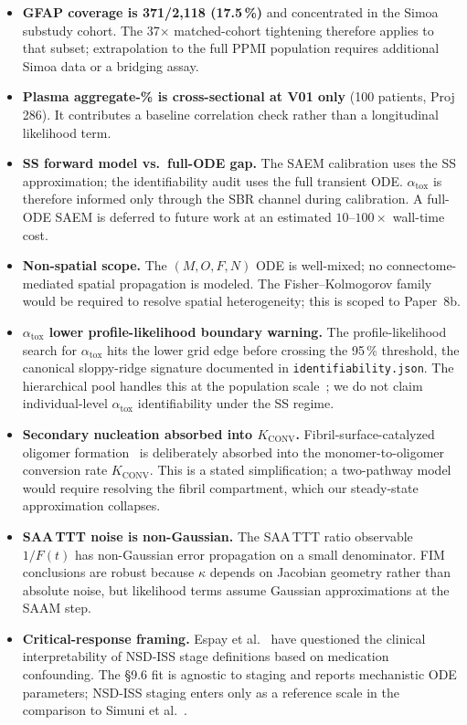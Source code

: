 \begin{itemize}
\item \textbf{GFAP coverage is 371/2,118 (17.5\,\%)} and concentrated in the Simoa substudy cohort. The 37$\times$ matched-cohort tightening therefore applies to that subset; extrapolation to the full PPMI population requires additional Simoa data or a bridging assay.
\item \textbf{Plasma aggregate-\% is cross-sectional at V01 only} (100 patients, Proj 286). It contributes a baseline correlation check rather than a longitudinal likelihood term.
\item \textbf{SS forward model vs.\ full-ODE gap.} The SAEM calibration uses the SS approximation; the identifiability audit uses the full transient ODE. $\alpha_\text{tox}$ is therefore informed only through the SBR channel during calibration. A full-ODE SAEM is deferred to future work at an estimated $10$--$100\times$ wall-time cost.
\item \textbf{Non-spatial scope.} The $(M, O, F, N)$ ODE is well-mixed; no connectome-mediated spatial propagation is modeled. The Fisher--Kolmogorov family~\cite{weickenmeier2019,fornari2019} would be required to resolve spatial heterogeneity; this is scoped to Paper~8b.
\item \textbf{$\alpha_\text{tox}$ lower profile-likelihood boundary warning.} The profile-likelihood search for $\alpha_\text{tox}$ hits the lower grid edge before crossing the 95\,\% threshold, the canonical sloppy-ridge signature documented in \texttt{identifiability.json}. The hierarchical pool handles this at the population scale~\cite{veronneau2020}; we do not claim individual-level $\alpha_\text{tox}$ identifiability under the SS regime.
\item \textbf{Secondary nucleation absorbed into $K_\text{CONV}$.} Fibril-surface-catalyzed oligomer formation~\cite{xu2024} is deliberately absorbed into the monomer-to-oligomer conversion rate $K_\text{CONV}$. This is a stated simplification; a two-pathway model would require resolving the fibril compartment, which our steady-state approximation collapses.
\item \textbf{SAA\,TTT noise is non-Gaussian.} The SAA\,TTT ratio observable $1/F(t)$ has non-Gaussian error propagation on a small denominator. FIM conclusions are robust because $\kappa$ depends on Jacobian geometry rather than absolute noise, but likelihood terms assume Gaussian approximations at the SAAM step.
\item \textbf{Critical-response framing.} Espay et al.~\cite{espay2025} have questioned the clinical interpretability of NSD-ISS stage definitions based on medication confounding. The §9.6 fit is agnostic to staging and reports mechanistic ODE parameters; NSD-ISS staging enters only as a reference scale in the comparison to Simuni et al.~\cite{simuni2024}.
\end{itemize}

